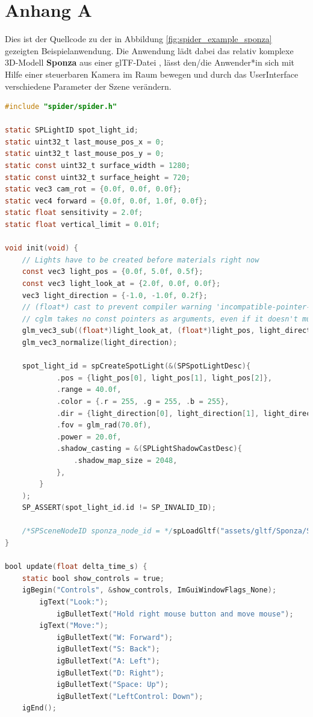 \documentclass[oneside]{ausarbeitung}
\begin{document}
\chapter{Anhang A}
\label{appendix:a}
Dies ist der Quellcode zu der in Abbildung \ref{fig:spider_example_sponza} gezeigten Beispielanwendung. Die Anwendung lädt dabei das relativ komplexe 3D-Modell \textbf{Sponza} \cite{sponza} aus einer glTF-Datei \cite{khronos:gltf}, lässt den/die Anwender*in sich mit Hilfe einer steuerbaren Kamera im Raum bewegen und durch das UserInterface verschiedene Parameter der Szene verändern.
\begin{lstlisting}[language=C, label={lst:full_example}, caption={Kompletter C99-Quellcode zur Erstellung einer interaktiven 3D-Szene mit der \textbf{spider}-Engine}]
#include "spider/spider.h"

static SPLightID spot_light_id;
static uint32_t last_mouse_pos_x = 0;
static uint32_t last_mouse_pos_y = 0;
static const uint32_t surface_width = 1280;
static const uint32_t surface_height = 720;
static vec3 cam_rot = {0.0f, 0.0f, 0.0f};
static vec4 forward = {0.0f, 0.0f, 1.0f, 0.0f};
static float sensitivity = 2.0f;
static float vertical_limit = 0.01f;

void init(void) {
    // Lights have to be created before materials right now 
    const vec3 light_pos = {0.0f, 5.0f, 0.5f};
    const vec3 light_look_at = {2.0f, 0.0f, 0.0f};
    vec3 light_direction = {-1.0, -1.0f, 0.2f};
    // (float*) cast to prevent compiler warning 'incompatible-pointer-types-discards-qualifiers'
    // cglm takes no const pointers as arguments, even if it doesn't mutate the vectors
    glm_vec3_sub((float*)light_look_at, (float*)light_pos, light_direction);
    glm_vec3_normalize(light_direction);

    spot_light_id = spCreateSpotLight(&(SPSpotLightDesc){
            .pos = {light_pos[0], light_pos[1], light_pos[2]},
            .range = 40.0f,
            .color = {.r = 255, .g = 255, .b = 255},
            .dir = {light_direction[0], light_direction[1], light_direction[2]},
            .fov = glm_rad(70.0f),
            .power = 20.0f,
            .shadow_casting = &(SPLightShadowCastDesc){
                .shadow_map_size = 2048,
            },
        }
    );
    SP_ASSERT(spot_light_id.id != SP_INVALID_ID);

    /*SPSceneNodeID sponza_node_id = */spLoadGltf("assets/gltf/Sponza/Sponza.gltf");
}

bool update(float delta_time_s) {
    static bool show_controls = true;
    igBegin("Controls", &show_controls, ImGuiWindowFlags_None);
        igText("Look:");
            igBulletText("Hold right mouse button and move mouse");
        igText("Move:");
            igBulletText("W: Forward");
            igBulletText("S: Back");
            igBulletText("A: Left");
            igBulletText("D: Right");
            igBulletText("Space: Up");
            igBulletText("LeftControl: Down");
    igEnd();


\end{lstlisting}
\end{document}
